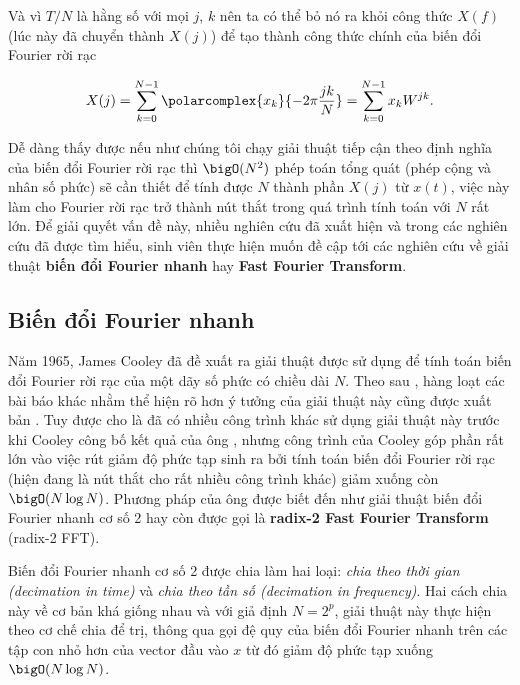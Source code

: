 			Và vì $T/N$ là hằng số với mọi $j$, $k$ nên ta có thể bỏ nó ra khỏi công thức $X(f)$ (lúc này đã chuyển thành $X(j)$) để tạo thành công thức chính của biến đổi Fourier rời rạc
			
				\begin{equation}
					X(j) = \sum_{k=0}^{N - 1} \polarcomplex{x_k}{-2\pi \frac{j k}{N}} = \sum_{k=0}^{N - 1} x_k W^{jk}.
				\label{dct::dct_formula}
				\end{equation}
			
			Dễ dàng thấy được nếu như chúng tôi chạy giải thuật tiếp cận theo định nghĩa của biến đổi Fourier rời rạc thì $\bigO(N^2)$ phép toán tổng quát (phép cộng và nhân số phức) sẽ cần thiết để tính được $N$ thành phần $X(j)$ từ $x(t)$, việc này làm cho Fourier rời rạc trở thành nút thắt trong quá trình tính toán với $N$ rất lớn. Để giải quyết vấn đề này, nhiều nghiên cứu đã xuất hiện và trong các nghiên cứu đã được tìm hiểu, sinh viên thực hiện muốn đề cập tới các nghiên cứu về giải thuật \textbf{biến đổi Fourier nhanh} hay \textbf{Fast Fourier Transform}.
		
		\subsection{Biến đổi Fourier nhanh}\label{subsection::signal_processing::dft::fft}
		
			Năm 1965, James Cooley \cite{fft_cooley} đã đề xuất ra giải thuật được sử dụng để tính toán biến đổi Fourier rời rạc của một dãy số phức có chiều dài $N$. Theo sau \cite{fft_cooley}, hàng loạt các bài báo khác nhằm thể hiện rõ hơn ý tưởng của giải thuật này cũng được xuất bản \cite{fft_for_fun, ws_fft}. Tuy được cho là đã có nhiều công trình khác sử dụng giải thuật này trước khi Cooley công bố kết quả của ông \cite{historical_fft}, nhưng công trình của Cooley góp phần rất lớn vào việc rút giảm độ phức tạp sinh ra bởi tính toán biến đổi Fourier rời rạc (hiện đang là nút thắt cho rất nhiều công trình khác) giảm xuống còn $\bigO(N \log N)$. Phương pháp của ông được biết đến như giải thuật biến đổi Fourier nhanh cơ số 2 hay còn được gọi là \textbf{radix-2 Fast Fourier Transform} (radix-2 FFT).
			
			 Biến đổi Fourier nhanh cơ số 2 được chia làm hai loại: \textit{chia theo thời gian (decimation in time)} và \textit{chia theo tần số (decimation in frequency)}. Hai cách chia này về cơ bản khá giống nhau và với giả định $N=2^p$, giải thuật này thực hiện theo cơ chế chia để trị, thông qua gọi đệ quy của biến đổi Fourier nhanh trên các tập con nhỏ hơn của vector đầu vào $x$ từ đó giảm độ phức tạp xuống $\bigO(N \log N)$.
				
